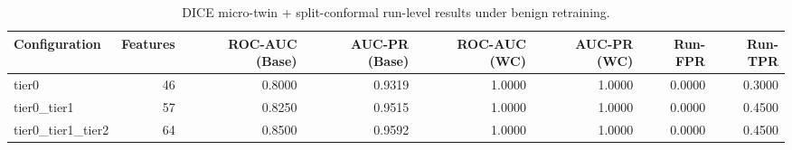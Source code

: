 \begin{table}[t]
\centering
\caption{DICE micro-twin + split-conformal run-level results under benign retraining.}
\label{tab:dice_full_overall}
\footnotesize
\begin{tabular}{lrrrrrrr}
\toprule
Configuration & Features & ROC-AUC (Base) & AUC-PR (Base) & ROC-AUC (WC) & AUC-PR (WC) & Run-FPR & Run-TPR \\
\midrule
tier0 & 46 & 0.8000 & 0.9319 & 1.0000 & 1.0000 & 0.0000 & 0.3000 \\
tier0_tier1 & 57 & 0.8250 & 0.9515 & 1.0000 & 1.0000 & 0.0000 & 0.4500 \\
tier0_tier1_tier2 & 64 & 0.8500 & 0.9592 & 1.0000 & 1.0000 & 0.0000 & 0.4500 \\
\bottomrule
\end{tabular}

\end{table}
